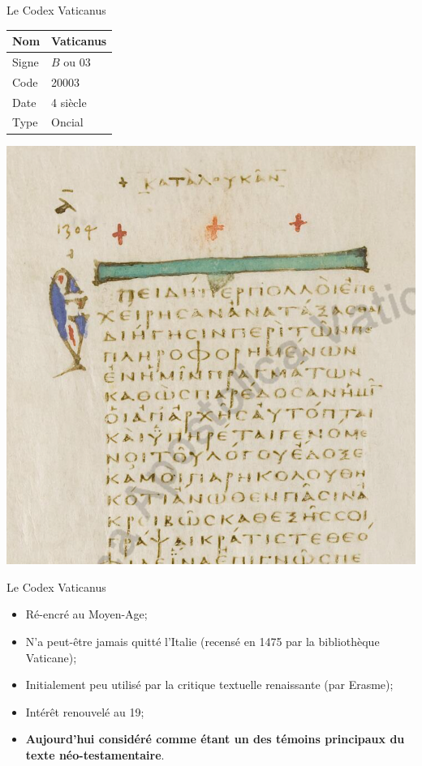 \documentclass[11pt]{beamer}
\begin{document}
\begin{frame}{Le Codex Vaticanus}
\begin{minipage}{.45\textwidth}
\begin{tabular}{l|l}
     Nom & Vaticanus \\
     \hline
     Signe & $B$ ou 03 \\
     \hline
     Code & 20003\\
     \hline
     Date & 4\ieme{} siècle \\
     \hline
     Type & Oncial \\
\end{tabular}
\end{minipage}
\hfill
\begin{minipage}{.45\textwidth}
    \includegraphics[scale=.2]{img/vaticanus_luke_inscriptio.png}
\end{minipage}
\end{frame}

\begin{frame}{Le Codex Vaticanus}
\begin{itemize}
    \item Ré-encré au Moyen-Age;
    \item N'a peut-être jamais quitté l'Italie (recensé en 1475 par la bibliothèque Vaticane);
    \item Initialement peu utilisé par la critique textuelle renaissante (par Erasme);
    \item Intérêt renouvelé au 19\ieme{};
    \item \textbf{Aujourd'hui considéré comme étant un des témoins principaux du texte néo-testamentaire}.
\end{itemize}
    
\end{frame}
\end{document}
